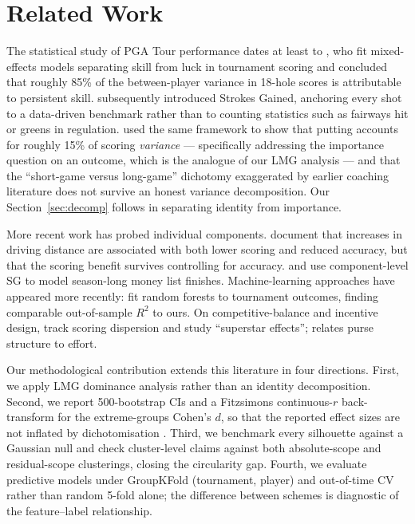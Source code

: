 \documentclass[11pt]{article}
\begin{document}
\section{Related Work}
\label{sec:related}

The statistical study of PGA Tour performance dates at least to \citet{connolly2008skill}, who fit mixed-effects models separating skill from luck in tournament scoring and concluded that roughly 85\% of the between-player variance in 18-hole scores is attributable to persistent skill.  \citet{broadie2008pga,broadie2012assessing,broadie2014every} subsequently introduced Strokes Gained, anchoring every shot to a data-driven benchmark rather than to counting statistics such as fairways hit or greens in regulation.  \citet{fearing2011golf} used the same framework to show that putting accounts for roughly 15\% of scoring \emph{variance} --- specifically addressing the importance question on an outcome, which is the analogue of our LMG analysis --- and that the ``short-game versus long-game'' dichotomy exaggerated by earlier coaching literature does not survive an honest variance decomposition.  Our Section~\ref{sec:decomp} follows \citet{fearing2011golf} in separating identity from importance.

More recent work has probed individual components.  \citet{hickman2019driving} document that increases in driving distance are associated with both lower scoring and reduced accuracy, but that the scoring benefit survives controlling for accuracy.  \citet{baugher2016statistical} and \citet{lonzani2014strokes} use component-level SG to model season-long money list finishes.  Machine-learning approaches have appeared more recently: \citet{kim2024random} fit random forests to tournament outcomes, finding comparable out-of-sample $R^2$ to ours.  On competitive-balance and incentive design, \citet{spears2018scoring} track scoring dispersion and \citet{brown2011quitters} study ``superstar effects''; \citet{alexander2014price} relates purse structure to effort.

Our methodological contribution extends this literature in four directions.  First, we apply LMG dominance analysis \citep{lindeman1980lmg,gromping2007lmg,shapley1953value} rather than an identity decomposition.  Second, we report 500-bootstrap CIs and a Fitzsimons \citep{fitzsimons2008death} continuous-$r$ back-transform for the extreme-groups Cohen's $d$, so that the reported effect sizes are not inflated by dichotomisation \citep{hunter1990methods}.  Third, we benchmark every silhouette against a Gaussian null and check cluster-level claims against both absolute-scope and residual-scope clusterings, closing the circularity gap.  Fourth, we evaluate predictive models under GroupKFold (tournament, player) and out-of-time CV rather than random 5-fold alone; the difference between schemes is diagnostic of the feature--label relationship.
\end{document}
